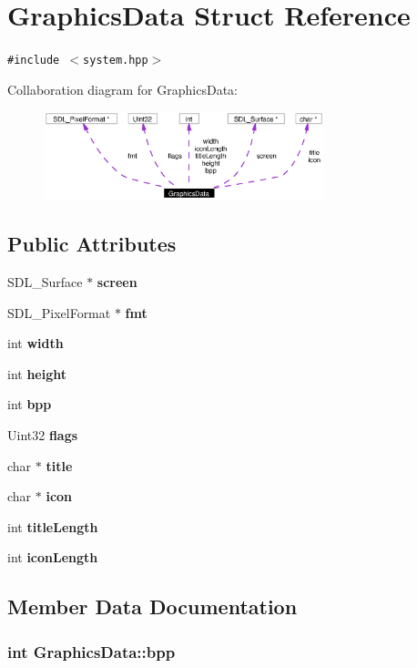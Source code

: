 \section{Graphics\-Data Struct Reference}
\label{structGraphicsData}
{\tt \#include $<$system.hpp$>$}

Collaboration diagram for Graphics\-Data:\begin{figure}[H]
\begin{center}
\leavevmode
\includegraphics[width=231pt]{structGraphicsData__coll__graph}
\end{center}
\end{figure}
\subsection*{Public Attributes}
\begin{CompactItemize}
\item 
SDL\_\-Surface $\ast$ {\bf screen}
\item 
SDL\_\-Pixel\-Format $\ast$ {\bf fmt}
\item 
int {\bf width}
\item 
int {\bf height}
\item 
int {\bf bpp}
\item 
Uint32 {\bf flags}
\item 
char $\ast$ {\bf title}
\item 
char $\ast$ {\bf icon}
\item 
int {\bf title\-Length}
\item 
int {\bf icon\-Length}
\end{CompactItemize}


\subsection{Member Data Documentation}
\subsubsection{\setlength{\rightskip}{0pt plus 5cm}int {\bf Graphics\-Data::bpp}}\label{structGraphicsData_o4}


